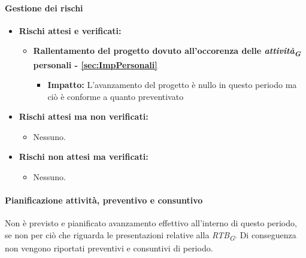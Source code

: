 \paragraph{Gestione dei rischi} 
\begin{itemize}
    \item \textbf{Rischi attesi e verificati:}
\begin{itemize}
    \item \textbf{Rallentamento del progetto dovuto all'occorenza delle \textit{attività}\textsubscript{\textit{G}} personali - \ref{sec:ImpPersonali}}
    \begin{itemize}
        \item \textbf{Impatto:}
       L'avanzamento del progetto è nullo in questo periodo ma ciò è conforme a quanto preventivato
    \end{itemize}
\end{itemize}
\item \textbf{Rischi attesi ma non verificati:}
    \begin{itemize}
        \item Nessuno.
    \end{itemize}
    \item \textbf{Rischi non attesi ma verificati:}
    \begin{itemize}
        \item Nessuno.
    \end{itemize}
\end{itemize}
\newpage
\paragraph{Pianificazione attività, preventivo e consuntivo}\hspace{1pt}
Non è previsto e pianificato avanzamento effettivo all’interno di questo periodo, se non per ciò che riguarda
le presentazioni relative alla \textit{RTB}\textsubscript{\textit{G}}.
Di conseguenza non vengono riportati preventivi e consuntivi di periodo.